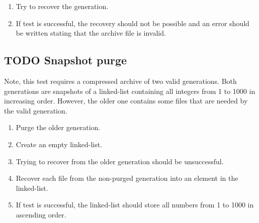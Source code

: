\documentclass[11pt]{article}
\begin{document}
\begin{enumerate}
\item Try to recover the generation.
\item If test is successful, the recovery should not be possible and an error should be written stating that the archive file is invalid.
\end{enumerate}
\subsection{{\bfseries\sffamily TODO} Snapshot purge}
\label{sec:orgce3a4a9}
Note, this test requires a compressed archive of two valid generations. Both generations are snapshots of a linked-list containing all integers from 1 to 1000 in increasing order. However, the older one contains some files that are needed by the valid generation. 

\begin{enumerate}
\item Purge the older generation.
\item Create an empty linked-list.
\item Trying to recover from the older generation should be unsuccessful.
\item Recover each file from the non-purged generation into an element in the linked-list.
\item If test is successful, the linked-list should store all numbers from 1 to 1000 in ascending order.
\end{enumerate}
\end{document}

